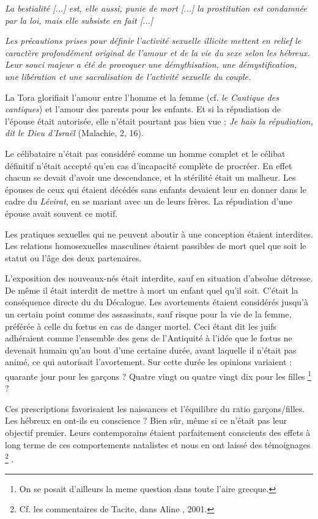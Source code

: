 \begin{displayquote}
{ \emph{La bestialité \emph{[...]} est, elle aussi, punie de mort \emph{[...]} la prostitution est condamnée par la loi, mais elle subsiste en fait \emph{[...]}}

 \emph{Les précautions prises pour définir l'activité sexuelle illicite mettent en relief le caractère profondément original de l'amour et de la vie du sexe selon les hébreux. Leur souci majeur a été de provoquer une démythisation, une démystification, une libération et une sacralisation de l'activité sexuelle du couple.}
}%
\end{displayquote}

 La Tora glorifiait l'amour entre l'homme et la femme (cf. \emph{le Cantique des cantiques}) et l'amour des parents pour les enfants. Et si la répudiation de l'épouse était autorisée, elle n'était pourtant pas bien vue ; \emph{Je hais la répudiation, dit le Dieu d'Israël} (Malachie, 2, 16). 
 
 Le célibataire n'était pas considéré comme un homme complet et le célibat définitif n'était accepté qu'en cas d'incapacité complète de procréer. En effet chacun se devait d'avoir une descendance, et la stérilité était un malheur. Les épouses de ceux qui étaient décédés sans enfants devaient leur en donner dans le cadre du \emph{Lévirat}, en se mariant avec un de leurs frères. La répudiation d'une épouse avait souvent ce motif. 

 Les pratiques sexuelles qui ne peuvent aboutir à une conception étaient interdites. Les relations homosexuelles masculines étaient passibles de mort quel que soit le statut ou l'âge des deux partenaires. 

 L'exposition des nouveaux-nés était interdite, sauf en situation d'absolue détresse. De même il était interdit de mettre à mort un enfant quel qu'il soit. C'était la conséquence directe du  du Décalogue. Les avortements étaient considérés jusqu'à un certain point comme des assassinats, sauf risque pour la vie de la femme, préférée à celle du fœtus en cas de danger mortel. Ceci étant dit les juifs adhéraient comme l'ensemble des gens de l'Antiquité à l'idée que le fœtus ne devenait humain qu'au bout d'une certaine durée, avant laquelle il n'était pas animé, ce qui autorisait l'avortement. Sur cette durée les opinions variaient : quarante jour pour les garçons ? Quatre vingt ou quatre vingt dix pour les filles \footnote{On se posait d'ailleurs la meme question dans toute l'aire grecque.} ?

 Ces prescriptions favorisaient les naissances et l'équilibre du ratio garçons/filles. Les hébreux en ont-ils eu conscience ? Bien sûr, même si ce n'était pas leur objectif premier. Leurs contemporains étaient parfaitement conscients des effets à long terme de ces comportements natalistes et nous en ont laissé des témoignages%
\footnote{Cf. les commentaires de Tacite, dans Aline , 2001.}%
.

